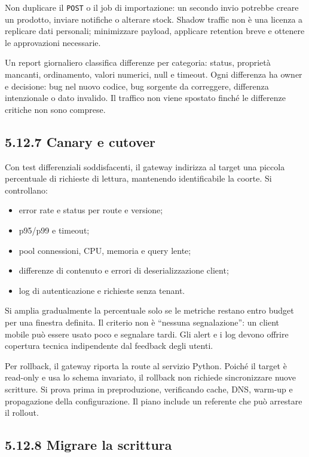 \documentclass[
  italian,
  10pt,
]{book}
\providecommand{\tightlist}{%
  \setlength{\itemsep}{0pt}\setlength{\parskip}{0pt}}
\begin{document}
Non duplicare il \texttt{POST} o il job di importazione: un secondo
invio potrebbe creare un prodotto, inviare notifiche o alterare stock.
Shadow traffic non è una licenza a replicare dati personali; minimizzare
payload, applicare retention breve e ottenere le approvazioni
necessarie.

Un report giornaliero classifica differenze per categoria: status,
proprietà mancanti, ordinamento, valori numerici, null e timeout. Ogni
differenza ha owner e decisione: bug nel nuovo codice, bug sorgente da
correggere, differenza intenzionale o dato invalido. Il traffico non
viene spostato finché le differenze critiche non sono comprese.

\subsection{5.12.7 Canary e cutover}\label{canary-e-cutover}

Con test differenziali soddisfacenti, il gateway indirizza al target una
piccola percentuale di richieste di lettura, mantenendo identificabile
la coorte. Si controllano:

\begin{itemize}
\tightlist
\item
  error rate e status per route e versione;
\item
  p95/p99 e timeout;
\item
  pool connessioni, CPU, memoria e query lente;
\item
  differenze di contenuto e errori di deserializzazione client;
\item
  log di autenticazione e richieste senza tenant.
\end{itemize}

Si amplia gradualmente la percentuale solo se le metriche restano entro
budget per una finestra definita. Il criterio non è ``nessuna
segnalazione'': un client mobile può essere usato poco e segnalare
tardi. Gli alert e i log devono offrire copertura tecnica indipendente
dal feedback degli utenti.

Per rollback, il gateway riporta la route al servizio Python. Poiché il
target è read-only e usa lo schema invariato, il rollback non richiede
sincronizzare nuove scritture. Si prova prima in preproduzione,
verificando cache, DNS, warm-up e propagazione della configurazione. Il
piano include un referente che può arrestare il rollout.

\subsection{5.12.8 Migrare la scrittura}\label{migrare-la-scrittura}
\end{document}
